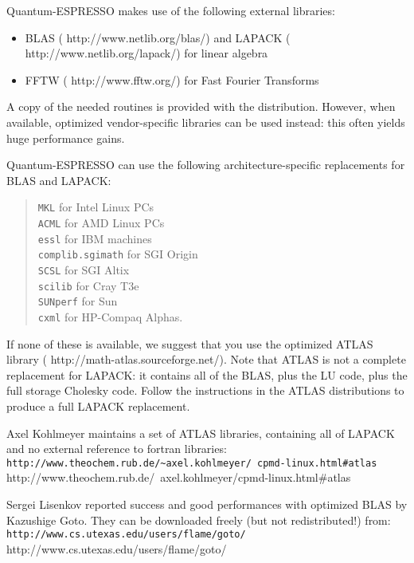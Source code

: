 \documentclass[12pt,a4paper]{article}
\begin{document}
Quantum-ESPRESSO makes use of the following external libraries:
\begin{itemize}
  \item BLAS
        (%
                           {http://www.netlib.org/blas/})
        and LAPACK\hfill\break
        (%
                           {http://www.netlib.org/lapack/})
        for linear algebra
  \item FFTW
        (%
                           {http://www.fftw.org/})
        for Fast Fourier Transforms
\end{itemize}
A copy of the needed routines is provided with the distribution.
However, when available, optimized vendor-specific libraries can be
used instead: this often yields huge performance gains.

Quantum-ESPRESSO can use the following architecture-specific replacements for
BLAS and LAPACK:
\begin{quote}
  \texttt{MKL} for Intel Linux PCs\\
  \texttt{ACML} for AMD Linux PCs\\
  \texttt{essl} for IBM machines\\
  \texttt{complib.sgimath} for SGI Origin\\
  \texttt{SCSL} for SGI Altix\\
  \texttt{scilib} for Cray T3e\\
  \texttt{SUNperf} for Sun\\
  \texttt{cxml} for HP-Compaq Alphas.
\end{quote}
If none of these is available, we suggest that you use the optimized
ATLAS library
(%
                   {http://math-atlas.sourceforge.net/}).
Note that ATLAS is not a complete replacement for LAPACK: it contains
all of the BLAS, plus the LU code, plus the full storage Cholesky
code.  Follow the instructions in the ATLAS distributions to produce a
full LAPACK replacement.

Axel Kohlmeyer maintains a set of ATLAS libraries, 
containing all of LAPACK and no external reference to fortran
libraries:\hfill\break
\htmladdnormallink%
{{\small\texttt{http://www.theochem.rub.de/\~{}axel.kohlmeyer/%
                cpmd-linux.html\#atlas}}}%
{http://www.theochem.rub.de/~axel.kohlmeyer/cpmd-linux.html\#atlas}

Sergei Lisenkov reported success and good performances with
optimized BLAS by Kazushige Goto.
They can be downloaded freely (but not redistributed!) from:
\htmladdnormallink%
{\texttt{http://www.cs.utexas.edu/users/flame/goto/}}%
{http://www.cs.utexas.edu/users/flame/goto/}
\end{document}
